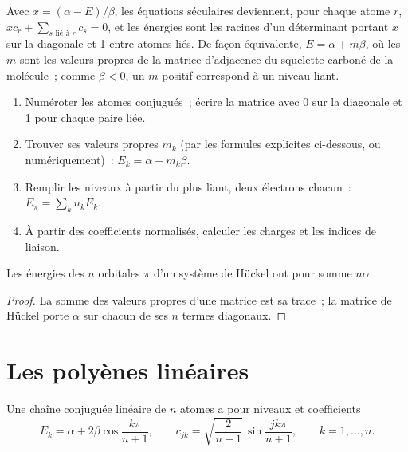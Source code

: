 Avec $x = (\alpha - E)/\beta$, les équations séculaires deviennent, pour chaque atome $r$,
$xc_r + \sum_{s \text{ lié à } r} c_s = 0$, et les énergies sont les racines d'un
déterminant portant $x$ sur la diagonale et 1 entre atomes liés. De façon équivalente, $E =
\alpha + m\beta$, où les $m$ sont les valeurs propres de la matrice d'adjacence du
squelette carboné de la molécule~; comme $\beta < 0$, un $m$ positif correspond à un niveau liant.

\begin{method}\label{met:b2:huckel:huckel}
\begin{enumerate}
  \item Numéroter les atomes conjugués~; écrire la matrice avec 0 sur la diagonale et 1
        pour chaque paire liée.
  \item Trouver ses valeurs propres $m_k$ (par les formules explicites ci-dessous, ou numériquement)~: $E_k =
        \alpha + m_k\beta$.
  \item Remplir les niveaux à partir du plus liant, deux électrons chacun~:
        $E_\pi = \sum_k n_k E_k$.
  \item À partir des coefficients normalisés, calculer les charges et les indices de liaison.
\end{enumerate}
\end{method}

\begin{proposition}[Trace]\label{prop:b2:huckel:trace}
Les énergies des $n$ orbitales $\pi$ d'un système de Hückel ont pour somme $n\alpha$.
\end{proposition}

\begin{proof}
La somme des valeurs propres d'une matrice est sa trace~; la matrice de Hückel porte $\alpha$
sur chacun de ses $n$ termes diagonaux.
\end{proof}

\section{Les polyènes linéaires}

\begin{theorem}\label{thm:b2:huckel:polyene}
Une chaîne conjuguée linéaire de $n$ atomes a pour niveaux et coefficients
\[
  E_k = \alpha + 2\beta\cos\frac{k\pi}{n + 1}, \qquad
  c_{jk} = \sqrt{\frac{2}{n + 1}}\,\sin\frac{jk\pi}{n + 1}, \qquad k = 1, \dots, n .
\]
\end{theorem}

